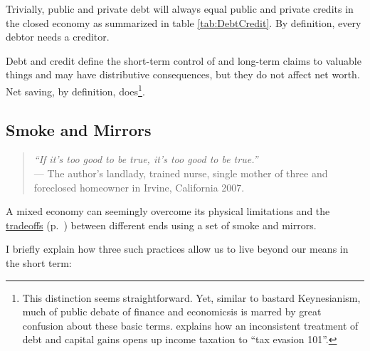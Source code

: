 \begin{enumerate}
	Trivially, public and private debt will always equal public and private credits in the closed economy as summarized in table \ref{tab:DebtCredit}. By definition, every debtor needs a creditor. 
	
	Debt and credit define the short-term control of and long-term claims to valuable things and may have distributive consequences, but they do not affect net worth. Net saving, by definition, does\footnote{
		This distinction seems straightforward. Yet, similar to bastard Keynesianism, much of public debate of finance and economicsis is marred by great confusion about these basic terms. \citealt{McCaffery2005} explains how an inconsistent treatment of debt and capital gains opens up income taxation to ``tax evasion 101''.}.%
\end{enumerate}

\subsection[Smoke and Mirrors]{Smoke and Mirrors} \label{sec:smoke-n-mirrors}

\begin{quote}
	\emph{``If it's too good to be true, it's too good to be true.''\\}
	--- The author's landlady, trained nurse, single mother of three and foreclosed homeowner in Irvine, California 2007.
\end{quote}

A mixed economy can seemingly overcome its physical limitations and the \hyperref[sec:tradeoffs]{tradeoffs} (p.~\pageref{sec:tradeoffs}) between different ends using a set of smoke and mirrors. 

I briefly explain how three such practices allow us to live beyond our means in the short term:

